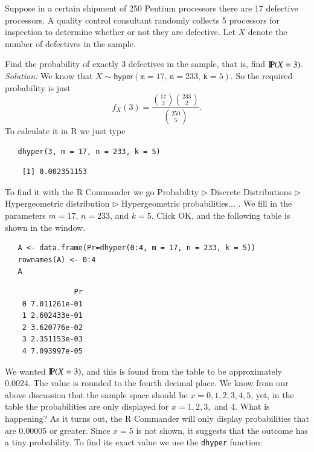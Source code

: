 \documentclass[captions=tableheading]{scrbook}
\begin{document}
\begin{example}
Suppose in a certain shipment of 250 Pentium processors there are 17 defective processors. A quality control consultant randomly collects 5 processors for inspection to determine whether or not they are defective. Let \(X\) denote the number of defectives in the sample.

Find the probability of exactly 3 defectives in the sample, that is, find \(\P(X=3)\). 
   \emph{Solution:} We know that \(X\sim\mathsf{hyper}(\mathtt{m}=17,\,\mathtt{n}=233,\,\mathtt{k}=5)\). So the required probability is just
   \[
   f_{X}(3)=\frac{{17 \choose 3}{233 \choose 2}}{{250 \choose 5}}.
   \]
   To calculate it in \textsf{R} we just type 


\begin{verbatim}
   dhyper(3, m = 17, n = 233, k = 5)
\end{verbatim}

\begin{verbatim}
    [1] 0.002351153
\end{verbatim}

   To find it with the \textsf{R} Commander we go \textsf{Probability} \(\triangleright\) \textsf{Discrete Distributions} \(\triangleright\) \textsf{Hypergeometric distribution} \(\triangleright\) \textsf{Hypergeometric probabilities}... . We fill in the parameters \(m=17\), \(n=233\), and \(k=5\). Click \textsf{OK}, and the following table is shown in the window.


\begin{verbatim}
   A <- data.frame(Pr=dhyper(0:4, m = 17, n = 233, k = 5))
   rownames(A) <- 0:4 
   A
\end{verbatim}

\begin{verbatim}
                Pr
    0 7.011261e-01
    1 2.602433e-01
    2 3.620776e-02
    3 2.351153e-03
    4 7.093997e-05
\end{verbatim}

   We wanted \(\P(X=3)\), and this is found from the table to be approximately 0.0024. The value is rounded to the fourth decimal place.
   We know from our above discussion that the sample space should be \(x=0,1,2,3,4,5\), yet, in the table the probabilities are only displayed for \(x = 1,2,3,\) and 4. What is happening? As it turns out, the \textsf{R} Commander will only display probabilities that are 0.00005 or greater. Since \(x=5\) is not shown, it suggests that the outcome has a tiny probability. To find its exact value we use the \texttt{dhyper} function:


\end{example}
\end{document}
